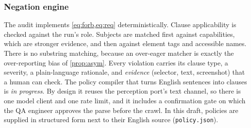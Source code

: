 \subsubsection{Negation engine}
\label{sec:system:negation}
The audit implements \cref{eq:forb,eq:req} deterministically. Clause
applicability is checked against the run's role. Subjects are matched first
against capabilities, which are stronger evidence, and then against element
tags and accessible names. There is no substring matching, because an
over-eager matcher is exactly the over-reporting bias of \cref{prop:asym}.
Every violation carries its clause type, a severity, a plain-language
rationale, and \emph{evidence} (selector, text, screenshot) that a human can
check. The policy compiler that turns English sentences into clauses is
\emph{in progress}. By design it reuses the perception port's text channel, so
there is one model client and one rate limit, and it includes a confirmation
gate on which the QA engineer approves the parse before the crawl. In this
draft, policies are supplied in structured form next to their English source
(\texttt{policy.json}).

